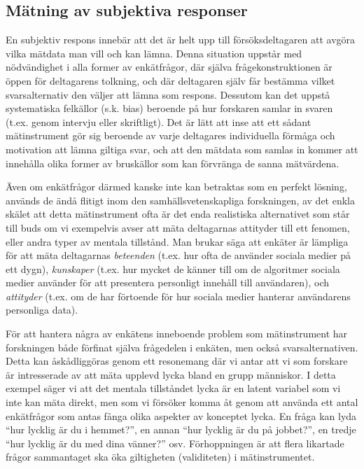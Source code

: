 \documentclass[
]{book}
\begin{document}
\hypertarget{sub07.3.2}{%
\subsection{Mätning av subjektiva responser}\label{sub07.3.2}}

En subjektiv respons innebär att det är helt upp till försöksdeltagaren att avgöra vilka mätdata man vill och kan lämna. Denna situation uppstår med nödvändighet i alla former av enkätfrågor, där själva frågekonstruktionen är öppen för deltagarens tolkning, och där deltagaren själv får bestämma vilket svarsalternativ den väljer att lämna som respons. Dessutom kan det uppstå systematiska felkällor (s.k. bias) beroende på hur forskaren samlar in svaren (t.ex. genom intervju eller skriftligt). Det är lätt att inse att ett sådant mätinstrument gör sig beroende av varje deltagares individuella förmåga och motivation att lämna giltiga svar, och att den mätdata som samlas in kommer att innehålla olika former av bruskällor som kan förvränga de sanna mätvärdena.

Även om enkätfrågor därmed kanske inte kan betraktas som en perfekt lösning, används de ändå flitigt inom den samhällsvetenskapliga forskningen, av det enkla skälet att detta mätinstrument ofta är det enda realistiska alternativet som står till buds om vi exempelvis avser att mäta deltagarnas attityder till ett fenomen, eller andra typer av mentala tillstånd. Man brukar säga att enkäter är lämpliga för att mäta deltagarnas \emph{beteenden} (t.ex. hur ofta de använder sociala medier på ett dygn), \emph{kunskaper} (t.ex. hur mycket de känner till om de algoritmer sociala medier använder för att presentera personligt innehåll till användaren), och \emph{attityder} (t.ex. om de har förtoende för hur sociala medier hanterar användarens personliga data).

För att hantera några av enkätens inneboende problem som mätinstrument har forskningen både förfinat själva frågedelen i enkäten, men också svarsalternativen. Detta kan åskådliggöras genom ett resonemang där vi antar att vi som forskare är intresserade av att mäta upplevd lycka bland en grupp människor. I detta exempel säger vi att det mentala tillståndet lycka är en latent variabel som vi inte kan mäta direkt, men som vi försöker komma åt genom att använda ett antal enkätfrågor som antas fånga olika aspekter av konceptet lycka. En fråga kan lyda ``hur lycklig är du i hemmet?'', en annan ``hur lycklig är du på jobbet?'', en tredje ``hur lycklig är du med dina vänner?'' osv. Förhoppningen är att flera likartade frågor sammantaget ska öka giltigheten (validiteten) i mätinstrumentet.
\end{document}
